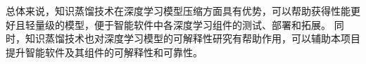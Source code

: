 总体来说，知识蒸馏技术在深度学习模型压缩方面具有优势，可以帮助获得性能更好且轻量级的模型，便于智能软件中各深度学习组件的测试、部署和拓展。
同时，知识蒸馏技术也对深度学习模型的可解释性研究有帮助作用，可以辅助本项目提升智能软件及其组件的可解释性和可靠性。












\begin{spacing}{1.3} %
	 \songti
	
	
	\vspace{11bp}
\end{spacing}
